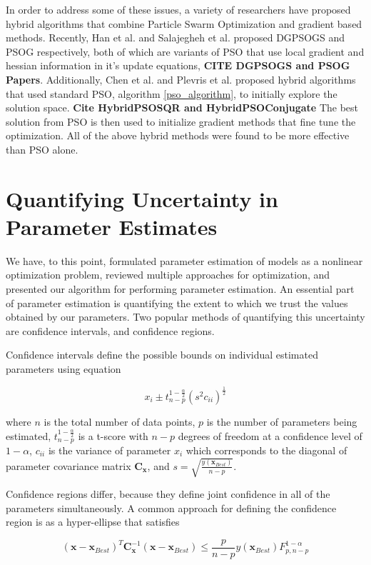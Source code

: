 In order to address some of these issues, a variety of researchers have proposed hybrid algorithms that combine Particle Swarm Optimization and gradient based methods. Recently, Han et al. and Salajegheh et al. proposed DGPSOGS and PSOG respectively, both of which are variants of PSO that use local gradient and hessian information in it's update equations, \textbf{CITE DGPSOGS and PSOG Papers}. Additionally, Chen et al. and Plevris et al. proposed hybrid algorithms that used standard PSO, algorithm \ref{pso_algorithm}, to initially explore the solution space. \textbf{Cite HybridPSOSQR and HybridPSOConjugate} The best solution from PSO is then used to initialize gradient methods that fine tune the optimization. All of the above hybrid methods were found to be more effective than PSO alone.

\section{Quantifying Uncertainty in Parameter Estimates}
We have, to this point, formulated parameter estimation of models as a nonlinear optimization problem, reviewed multiple approaches for optimization, and presented our algorithm for performing parameter estimation. An essential part of parameter estimation is quantifying the extent to which we trust the values obtained by our parameters. Two popular methods of quantifying this uncertainty are confidence intervals, and confidence regions.

Confidence intervals define the possible bounds on individual estimated parameters using equation 

\begin{equation} \label{norm_conf_interval}
    x_i \pm t_{n-p}^{1-\frac{\alpha}{2}}(s^2 c_{ii})^{\frac{1}{2}}
\end{equation}

where $n$ is the total number of data points, $p$ is the number of parameters being estimated, $t_{n-p}^{1-\frac{\alpha}{2}}$ is a t-score with $n-p$ degrees of freedom at a confidence level of $1-\alpha$, $c_{ii}$ is the variance of parameter $x_i$ which corresponds to the diagonal of parameter covariance matrix $\mathbf{C}_\mathbf{x}$, and $s = \sqrt{\frac{y(\mathbf{x}_{Best})}{n-p}}$. 

Confidence regions differ, because they define joint confidence in all of the parameters simultaneously. A common approach for defining the confidence region is as a hyper-ellipse that satisfies

\begin{equation} \label{norm_conf_region}
    (\mathbf{x}-\mathbf{x}_{Best})^T \mathbf{C}_\mathbf{x}^{-1}(\mathbf{x}-\mathbf{x}_{Best}) \leq \frac{p}{n-p} y(\mathbf{x}_{Best})F_{p,n-p}^{1-\alpha}
\end{equation}

